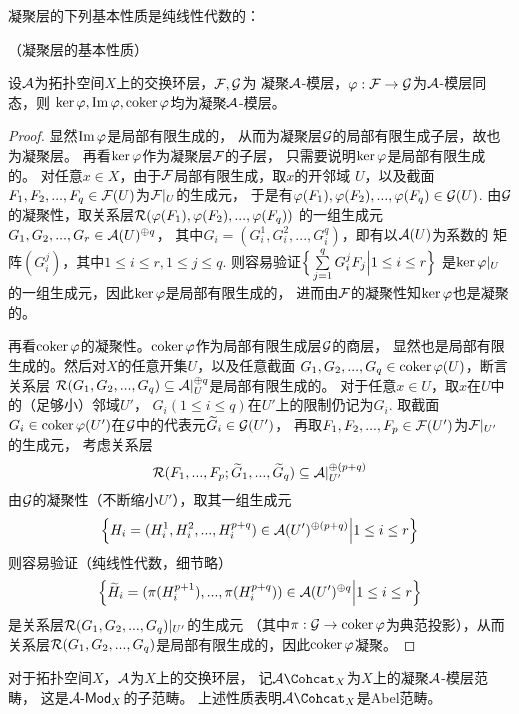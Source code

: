凝聚层的下列基本性质是纯线性代数的：

\begin{prop}（凝聚层的基本性质）

设$\mathcal{A}$为拓扑空间$X$上的交换环层，$\mathcal{F},\mathcal{G}$为
凝聚$\mathcal{A}$-模层，$\varphi:\mathcal{F}\to\mathcal{G}$为$\mathcal{A}$-模层同态，则
$\ker\varphi,\operatorname{Im}\varphi,\operatorname{coker}\varphi$均为凝聚$\mathcal{A}$-模层。
\end{prop}

\begin{proof}
显然$\operatorname{Im}\varphi$是局部有限生成的，
从而为凝聚层$\mathcal{G}$的局部有限生成子层，故也为凝聚层。
再看$\ker\varphi$作为凝聚层$\mathcal{F}$的子层，
只需要说明$\ker\varphi$是局部有限生成的。
对任意$x\in X$，由于$\mathcal{F}$局部有限生成，取$x$的开邻域
$U$，以及截面$F_1,F_2,...,F_q\in\mathcal{F}(U)$为$\mathcal{F}|_U$的生成元，
于是有$\varphi(F_1),\varphi(F_2),...,\varphi(F_q)\in\mathcal{G}(U)$.
由$\mathcal{G}$的凝聚性，取关系层$\mathcal{R}(\varphi(F_1),\varphi(F_2),...,\varphi(F_q))$
的一组生成元$G_1,G_2,...,G_r\in\mathcal{A}(U)^{\oplus q}$，
其中$G_i=(G_i^1,G_i^2,...,G_i^q)$，即有以$\mathcal{A}(U)$为系数的
矩阵$(G_i^j)$，其中$1\leq i\leq r,1\leq j\leq q$.
则容易验证$\Big\{ \sum\limits_{j=1}^qG_i^jF_j \Big| 1\leq i\leq r \Big\}$
是$\ker\varphi|_U$的一组生成元，因此$\ker\varphi$是局部有限生成的，
进而由$\mathcal{F}$的凝聚性知$\ker\varphi$也是凝聚的。

再看$\operatorname{coker}\varphi$的凝聚性。$\operatorname{coker}\varphi$作为局部有限生成层$\mathcal{G}$的商层，
显然也是局部有限生成的。然后对$X$的任意开集$U$，以及任意截面
$G_1,G_2,...,G_q\in\operatorname{coker}\varphi(U)$，断言关系层
$\mathcal{R}(G_1,G_2,...,G_q)\subseteq\mathcal{A}|_U^{\oplus q}$是局部有限生成的。
对于任意$x\in U$，取$x$在$U$中的（足够小）邻域$U'$，
$G_i(1\leq i\leq q)$在$U'$上的限制仍记为$G_i$.
取截面$G_i\in\operatorname{coker}\varphi(U')$在$\mathcal{G}$中的代表元$\widetilde{G}_i\in\mathcal{G}(U')$，
再取$F_1,F_2,...,F_p\in\mathcal{F}(U')$为$\mathcal{F}|_{U'}$的生成元，
考虑关系层
$$
  \mathcal{R}(F_1,...,F_p;\widetilde{G}_1,...,\widetilde{G}_q)
\subseteq\mathcal{A}|_{U'}^{\oplus(p+q)}
$$
由$\mathcal{G}$的凝聚性（不断缩小$U'$），取其一组生成元
$$
  \Big\{ H_i=(H_i^1,H_i^2,...,H_i^{p+q})\in\mathcal{A}(U')^{\oplus(p+q)} \Big| 1\leq i\leq r \Big\}
$$
则容易验证（纯线性代数，细节略）
$$
  \Big\{ \widetilde{H}_i=(\pi(H_i^{p+1}),...,\pi(H_i^{p+q}))\in\mathcal{A}(U')^{\oplus q} \Big| 1\leq i\leq r \Big\}
$$
是关系层$\mathcal{R}(G_1,G_2,...,G_q)|_{U'}$的生成元
（其中$\pi:\mathcal{G}\to\operatorname{coker}\varphi$为典范投影），从而
关系层$\mathcal{R}(G_1,G_2,...,G_q)$是局部有限生成的，因此$\operatorname{coker}\varphi$凝聚。
\end{proof}

\begin{rem}对于拓扑空间$X$，$\mathcal{A}$为$X$上的交换环层，
记$\mcalA\Cohcat_X$为$X$上的凝聚$\mathcal{A}$-模层范畴，
这是$\mathcal{A}\operatorname{\!\text{-}\mathsf{Mod}}_X$的子范畴。
上述性质表明$\mcalA\Cohcat_X$是Abel范畴。
\end{rem}


